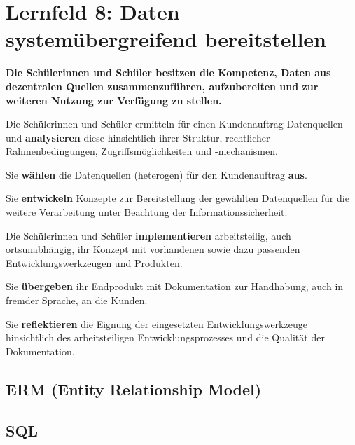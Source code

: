 \chapter{Lernfeld 8: Daten systemübergreifend bereitstellen}

\textbf{Die Schülerinnen und Schüler besitzen die Kompetenz, Daten aus dezentralen Quellen zusammenzuführen, aufzubereiten und zur weiteren Nutzung zur Verfügung zu
stellen.}

Die Schülerinnen und Schüler ermitteln für einen Kundenauftrag Datenquellen und \textbf{analysieren} diese hinsichtlich ihrer Struktur, rechtlicher Rahmenbedingungen, Zugriffsmöglichkeiten und -mechanismen.

Sie \textbf{wählen} die Datenquellen (heterogen) für den Kundenauftrag \textbf{aus}.

Sie \textbf{entwickeln} Konzepte zur Bereitstellung der gewählten Datenquellen für die weitere Verarbeitung unter Beachtung der Informationssicherheit.

Die Schülerinnen und Schüler \textbf{implementieren} arbeitsteilig, auch ortsunabhängig, ihr Konzept mit vorhandenen sowie dazu passenden Entwicklungswerkzeugen und Produkten.

Sie \textbf{übergeben} ihr Endprodukt mit Dokumentation zur Handhabung, auch in fremder Sprache, an die Kunden.

Sie \textbf{reflektieren} die Eignung der eingesetzten Entwicklungswerkzeuge hinsichtlich des arbeitsteiligen Entwicklungsprozesses und die Qualität der Dokumentation. 

\section{ERM (Entity Relationship Model)}

\section{SQL}